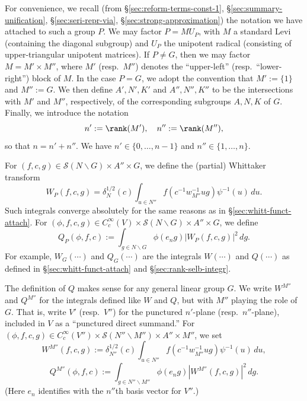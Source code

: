 For convenience, we recall (from \S\ref{sec:reform-terms-const-1}, \S\ref{sec:summary-unification}, \S\ref{sec:seri-repr-via}, \S\ref{sec:strong-approximation}) the notation we have attached to such a group $P$.  We may factor $P = M {U_P}$, with $M$ a standard Levi (containing the diagonal subgroup) and ${U_P}$ the unipotent radical (consisting of upper-triangular unipotent matrices).  If $P \neq G$, then we may factor $M = M' \times M''$, where $M'$ (resp.\ $M''$) denotes the ``upper-left'' (resp.\ ``lower-right'') block of $M$.  In the case $P = G$, we adopt the convention that $M' := \{1\}$ and $M'' := G$.  We then define $A', N', K'$ and $A'', N'', K''$ to be the intersections with $M'$ and $M''$, respectively, of the corresponding subgroups $A,N,K$ of $G$.  Finally, we introduce the notation
\begin{equation*}
  n' := \rank(M'), \quad n'' := \rank(M''),
\end{equation*}
so that $n = n' + n''$.  We have $n' \in \{0,\dotsc,n-1\}$ and $n'' \in \{1, \dotsc, n\}$.

For $(f, c,g) \in \mathcal{S}(N \backslash G) \times A'' \times G$, we define the (partial) Whittaker transform
\begin{equation*}
  W_P(f,c,g) = \delta_{N}^{1/2}(c) \int_{u \in N''} f(c^{-1} w^{-1}_{M''} u g) \psi^{-1} (u) \,d u.
\end{equation*}
Such integrals converge absolutely for the same reasons as in \S\ref{sec:whitt-funct-attach}.  For $(\phi,f,c,g) \in C_c^\infty(V) \times \mathcal{S}(N \backslash G) \times A'' \times G$, we define
\begin{equation*}
  Q_P(\phi,f,c) := \int_{g \in N \backslash G}
  \phi(e_n g) |W_P(f,c,g)|^2 \, d g.
\end{equation*}
For example, $W_G(\dotsb)$ and $Q_G(\dotsb)$ are the integrals $W(\dotsb)$ and $Q(\dotsb)$ as defined in \S\ref{sec:whitt-funct-attach} and \S\ref{sec:rank-selb-integr}.

The definition of $Q$ makes sense for any general linear group $G$.  We write $W^{M''}$ and $Q^{M''}$ for the integrals defined like $W$ and $Q$, but with $M''$ playing the role of $G$.  That is, write $V'$ (resp.\ $V''$) for the punctured $n'$-plane (resp.\ $n''$-plane), included in $V$ as a ``punctured direct summand.''  For $(\phi, f, c, g) \in C_c^\infty(V'') \times \mathcal{S}(N'' \backslash M'') \times A'' \times M''$, we set
\begin{equation*}
  W^{M''}(f,c,g) := \delta_{N''}^{1/2}(c) \int_{u \in N''} f(c^{-1} w_{M''}^{-1} u g) \psi^{-1}(u) \, d u,
\end{equation*}
\begin{equation*}
  Q^{M''}(\phi,f,c) := \int_{g \in N'' \backslash M''} \phi (e_{n} g) |W^{M''}(f,c,g)|^2 \, d g.
\end{equation*}
(Here $e_n$ identifies with the $n''$th basis vector for $V''$.)

